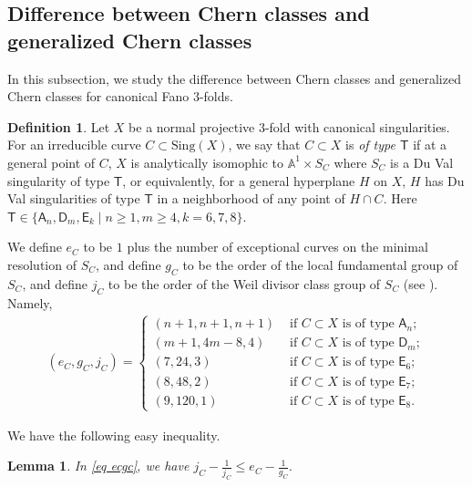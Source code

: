 \documentclass[12pt,twoside]{amsart}
\newtheorem{lem}[thm]{Lemma}
\theoremstyle{definition}
\newtheorem{defn}[thm]{Definition}
\begin{document}
\subsection{Difference between Chern classes and generalized Chern classes}

In this subsection, we study the difference between Chern classes and generalized Chern classes for canonical Fano $3$-folds. 
 
\begin{defn}\label{def ecgc}
Let $X$ be a normal projective $3$-fold with canonical singularities.
For an irreducible curve $C\subset \textrm{Sing}(X)$, we say that $C\subset X$ is {\it of type $\mathsf{T}$} if at a general point of $C$, $X$ is analytically isomophic to $\mathbb{A}^1\times S_C$ where $S_C$ is a Du Val singularity of type $\mathsf{T}$, or equivalently, for a general hyperplane $H$ on $X$, $H$ has Du Val singularities of type $\mathsf{T}$ in a neighborhood of any point of $H\cap C$. Here $\mathsf{T}\in \{\mathsf{A}_n, \mathsf{D}_m, \mathsf{E}_k\mid n\geq 1, m\geq 4, k=6,7,8\}.$ 

We define $e_C$ to be $1$ plus the number of exceptional curves on the minimal resolution of $S_C$, and define $g_C$ to be 
 the order of the local fundamental group of $S_C$, and define $j_C$ to be 
 the order of the Weil divisor class group of $S_C$ (see \cite[{Remark~4.2.9}]{Kawakita2024}). 
 Namely, 
\begin{align}(e_C, g_C, j_C)=\begin{cases} (n+1, n+1, n+1) & \text{ if } C\subset X \text{ is of type } \mathsf{A}_n;\\
(m+1, 4m-8, 4) & \text{ if } C\subset X \text{ is of type } \mathsf{D}_m;\\
(7, 24, 3) & \text{ if } C\subset X \text{ is of type } \mathsf{E}_6;\\
(8, 48, 2) & \text{ if } C\subset X \text{ is of type } \mathsf{E}_7;\\
(9, 120,1) & \text{ if } C\subset X \text{ is of type } \mathsf{E}_8.
 \end{cases}\label{eq ecgc}
\end{align}
\end{defn}

We have the following easy inequality. 
\begin{lem}\label{lem j<e-1/g}
 In \eqref{eq ecgc}, we have $j_C-\frac{1}{j_C}\leq e_C-\frac{1}{g_C}.$
\end{lem}
 
\end{document}
